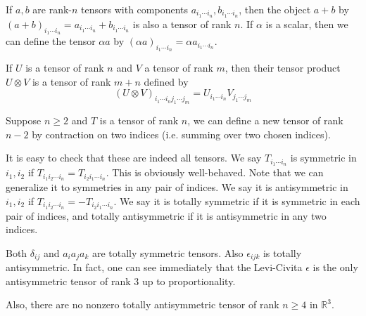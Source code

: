 \begin{definition}
    If $a,b$ are rank-$n$ tensors with components $a_{i_1\cdots i_n},b_{i_1\cdots i_n}$, then the object $a+b$ by $(a+b)_{i_1\cdots i_n}=a_{i_1\cdots i_n}+b_{i_1\cdots i_n}$ is also a tensor of rank $n$.
    If $\alpha$ is a scalar, then we can define the tensor $\alpha a$ by $(\alpha a)_{i_1\cdots i_n}=\alpha a_{i_1\cdots i_n}$.
\end{definition}
\begin{definition}
    If $U$ is a tensor of rank $n$ and $V$ a tensor of rank $m$, then their tensor product $U\otimes V$ is a tensor of rank $m+n$ defined by
    $$(U\otimes V)_{i_1\cdots i_nj_1\cdots j_m}=U_{i_1\cdots i_n}V_{j_1\cdots j_m}$$
\end{definition}
\begin{definition}
    Suppose $n\ge 2$ and $T$ is a tensor of rank $n$, we can define a new tensor of rank $n-2$ by contraction on two indices (i.e. summing over two chosen indices).
\end{definition}
It is easy to check that these are indeed all tensors.
We say $T_{i_1\cdots i_n}$ is symmetric in $i_1,i_2$ if $T_{i_1i_2\cdots i_n}=T_{i_2i_1\cdots i_n}$.
This is obviously well-behaved.
Note that we can generalize it to symmetries in any pair of indices.
We say it is antisymmetric in $i_1,i_2$ if $T_{i_1i_2\cdots i_n}=-T_{i_2i_1\cdots i_n}$.
We say it is totally symmetric if it is symmetric in each pair of indices, and totally antisymmetric if it is antisymmetric in any two indices.
\begin{example}
    Both $\delta_{ij}$ and $a_ia_ja_k$ are totally symmetric tensors.
    Also $\epsilon_{ijk}$ is totally antisymmetric.
    In fact, one can see immediately that the Levi-Civita $\epsilon$ is the only antisymmetric tensor of rank $3$ up to proportionality.
\end{example}
Also, there are no nonzero totally antisymmetric tensor of rank $n\ge 4$ in $\mathbb R^3$.
